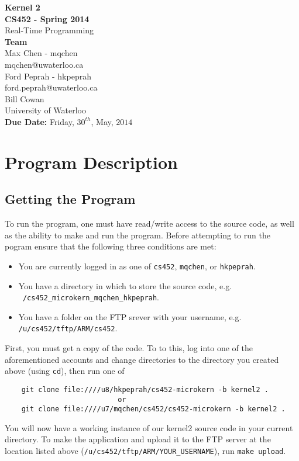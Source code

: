 \documentclass[12pt]{article}
\begin{document}
\thispagestyle{empty}
\begin{center}
  {\bf\Large Kernel 2}\\
  {\bf\large CS452 - Spring 2014}\\
  Real-Time Programming\vspace{5cm}\\
  {\bf Team }\\
  Max Chen - mqchen\\
  mqchen@uwaterloo.ca\\[1\baselineskip]
  Ford Peprah - hkpeprah\\
  ford.peprah@uwaterloo.ca\vspace{5cm}\\
  Bill Cowan\\
  University of Waterloo\\
  {\bf Due Date:} Friday, $30^{th}$, May, $2014$
\end{center}
\newpage
\thispagestyle{empty}
\tableofcontents
\newpage
\section{Program Description}
\subsection{Getting the Program}
To run the program, one must have read/write access to the source code, as well as the ability to make and run the program.  Before attempting to run the pogram ensure that the following three conditions are met:
\begin{itemize}
  \item You are currently logged in as one of \texttt{cs452}, \texttt{mqchen}, or \texttt{hkpeprah}.
  \item You have a directory in which to store the source code, e.g. \texttt{~/cs452\_microkern\_mqchen\_hkpeprah}.
  \item You have a folder on the FTP srever with your username, e.g. \texttt{/u/cs452/tftp/ARM/cs452}.
\end{itemize}
First, you must get a copy of the code.  To to this, log into one of the aforementioned accounts and change directories to the directory you created above (using \texttt{cd}), then run one of
\begin{center}
  \begin{verbatim}
    git clone file:////u8/hkpeprah/cs452-microkern -b kernel2 .
                           or
    git clone file:////u7/mqchen/cs452/cs452-microkern -b kernel2 .
  \end{verbatim}
\end{center}
You will now have a working instance of our kernel2 source code in your current directory.  To make the application and upload it to the FTP server at the location listed above (\texttt{/u/cs452/tftp/ARM/YOUR\_USERNAME}), run \texttt{make upload}.
\\[1\baselineskip]
\end{document}

